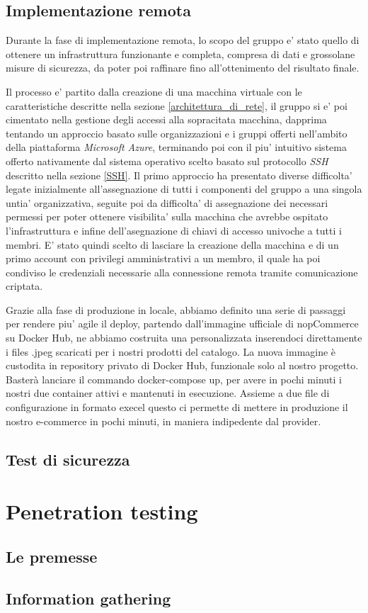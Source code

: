 \documentclass[a4paper]{report}
\begin{document}
	 \section{Implementazione remota} \label{implementazione_remota}
		Durante la fase di implementazione remota, lo scopo del gruppo e' stato quello di ottenere un infrastruttura
		funzionante e completa, compresa di dati e grossolane misure di sicurezza, da poter poi raffinare fino
		all'ottenimento del risultato finale.

		Il processo e' partito dalla creazione di una macchina virtuale con le caratteristiche descritte nella sezione
		\ref{architettura_di_rete}, il gruppo si e' poi cimentato nella gestione degli accessi alla sopracitata
		macchina, dapprima tentando un approccio basato sulle organizzazioni e i gruppi offerti nell'ambito della
		piattaforma \emph{Microsoft Azure}, terminando poi con il piu' intuitivo sistema offerto nativamente dal sistema
		operativo scelto basato sul protocollo \emph{SSH} descritto nella sezione \ref{SSH}.
		Il primo approccio ha presentato diverse difficolta' legate inizialmente all'assegnazione di tutti i componenti
		del gruppo a una singola untia' organizzativa, seguite poi da difficolta' di assegnazione dei necessari permessi
		per poter ottenere visibilita' sulla macchina che avrebbe ospitato l'infrastruttura e infine dell'asegnazione di
		chiavi di accesso univoche a tutti i membri. E' stato quindi scelto di lasciare la creazione della macchina e di
		un primo account con privilegi amministrativi a un membro, il quale ha poi condiviso le credenziali necessarie
		alla connessione remota tramite comunicazione criptata.
		
		Grazie alla fase di produzione in locale, abbiamo definito una serie di passaggi per rendere piu' agile il 
		deploy, partendo dall'immagine ufficiale di nopCommerce su Docker Hub, ne abbiamo costruita una personalizzata 
		inserendoci direttamente i files .jpeg scaricati per i nostri prodotti del catalogo.
		La nuova immagine è custodita in repository privato di Docker Hub, funzionale solo al nostro progetto.
		Basterà lanciare il commando docker-compose up, per avere in pochi minuti i nostri due container attivi e
		mantenuti in esecuzione. 
		Assieme a due file di configurazione in formato execel questo ci permette di mettere in produzione il nostro 
		e-commerce in pochi minuti, in maniera indipedente dal provider.

	\section{Test di sicurezza} \label{test_di_sicurezza}

\chapter{Penetration testing} \label{penetration_testing}
	\section{Le premesse} \label{le_premesse}
	\section{Information gathering} \label{information_gathering}
\end{document}
